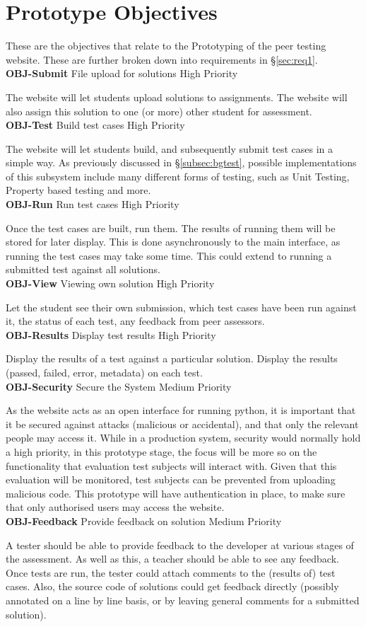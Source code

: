 \documentclass[a4paper,11pt]{report}
\newcommand{\objitem}[4]{\textbf{\\OBJ-#1} \quad #2 \hfill #3\par#4}
\begin{document}
\section{Prototype Objectives}
\label{sec:proto-obj}
These are the objectives that relate to the Prototyping of the peer testing website. These are further broken down into requirements in \S\ref{sec:req1}.
\objitem{Submit}{File upload for solutions}{High Priority}{The website will let students upload solutions to assignments. The website will also assign this solution to one (or more) other student for assessment.}
\objitem{Test}{Build test cases}{High Priority}{The website will let students build, and subsequently submit test cases in a simple way. As previously discussed in \S\ref{subsec:bgtest}, possible implementations of this subsystem include many different forms of testing, such as Unit Testing, Property based testing and more.}
\objitem{Run}{Run test cases}{High Priority}{Once the test cases are built, run them. The results of running them will be stored for later display. This is done asynchronously to the main interface, as running the test cases may take some time. This could extend to running a submitted test against all solutions.}
\objitem{View}{Viewing own solution}{High Priority}{Let the student see their own submission, which test cases have been run against it, the status of each test, any feedback from peer assessors.}
\objitem{Results}{Display test results}{High Priority}{Display the results of a test against a particular solution. Display the results (passed, failed, error, metadata) on each test.}
\objitem{Security}{Secure the System}{Medium Priority}{As the website acts as an open interface for running python, it is important that it be secured against attacks (malicious or accidental), and that only the relevant people may access it. While in a production system, security would normally hold a high priority, in this prototype stage, the focus will be more so on the functionality that evaluation test subjects will interact with. Given that this evaluation will be monitored, test subjects can be prevented from uploading malicious code. This prototype will have authentication in place, to make sure that only authorised users may access the website.}
\objitem{Feedback}{Provide feedback on solution}{Medium Priority}{A tester should be able to provide feedback to the developer at various stages of the assessment. As well as this, a teacher should be able to see any feedback. Once tests are run, the tester could attach comments to the (results of) test cases. Also, the source code of solutions could get feedback directly (possibly annotated on a line by line basis, or by leaving general comments for a submitted solution).}
\end{document}
